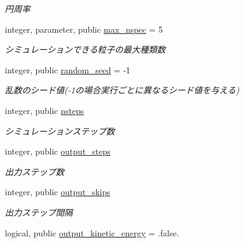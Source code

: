 \begin{DoxyCompactItemize}
\begin{DoxyCompactList}\small\item\em 円周率 \end{DoxyCompactList}\item 
\hypertarget{classparameters_a402ac2b1acba21a0e9487023da144ca0}{integer, parameter, public \hyperlink{classparameters_a402ac2b1acba21a0e9487023da144ca0}{max\-\_\-nspec} = 5}\label{classparameters_a402ac2b1acba21a0e9487023da144ca0}

\begin{DoxyCompactList}\small\item\em シミュレーションできる粒子の最大種類数 \end{DoxyCompactList}\item 
\hypertarget{classparameters_a2c70a15613816409aa4490ad5131cc0e}{integer, public \hyperlink{classparameters_a2c70a15613816409aa4490ad5131cc0e}{random\-\_\-seed} = -\/1}\label{classparameters_a2c70a15613816409aa4490ad5131cc0e}

\begin{DoxyCompactList}\small\item\em 乱数のシード値(-\/1の場合実行ごとに異なるシード値を与える) \end{DoxyCompactList}\item 
\hypertarget{classparameters_a4c2e26739d4053828a07e3f5de9baae4}{integer, public \hyperlink{classparameters_a4c2e26739d4053828a07e3f5de9baae4}{nsteps}}\label{classparameters_a4c2e26739d4053828a07e3f5de9baae4}

\begin{DoxyCompactList}\small\item\em シミュレーションステップ数 \end{DoxyCompactList}\item 
\hypertarget{classparameters_a7b100e2dea245480115b4b112fac5239}{integer, public \hyperlink{classparameters_a7b100e2dea245480115b4b112fac5239}{output\-\_\-steps}}\label{classparameters_a7b100e2dea245480115b4b112fac5239}

\begin{DoxyCompactList}\small\item\em 出力ステップ数 \end{DoxyCompactList}\item 
\hypertarget{classparameters_a5b8fe3de5880a49c66a52c4dee2603ce}{integer, public \hyperlink{classparameters_a5b8fe3de5880a49c66a52c4dee2603ce}{output\-\_\-skips}}\label{classparameters_a5b8fe3de5880a49c66a52c4dee2603ce}

\begin{DoxyCompactList}\small\item\em 出力ステップ間隔 \end{DoxyCompactList}\item 
\hypertarget{classparameters_a316c3557f8613012afa789b756a805ec}{logical, public \hyperlink{classparameters_a316c3557f8613012afa789b756a805ec}{output\-\_\-kinetic\-\_\-energy} = .false.}\label{classparameters_a316c3557f8613012afa789b756a805ec}


\end{DoxyCompactItemize}
